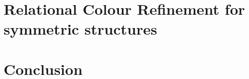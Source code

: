 \documentclass[a4paper,11pt,DIV=15]{scrartcl} %
\theoremstyle{plain}
\theoremstyle{definition}
\begin{document}


\section {Relational Colour Refinement for symmetric structures}


\section{Conclusion}



\clearpage



\end{document}
